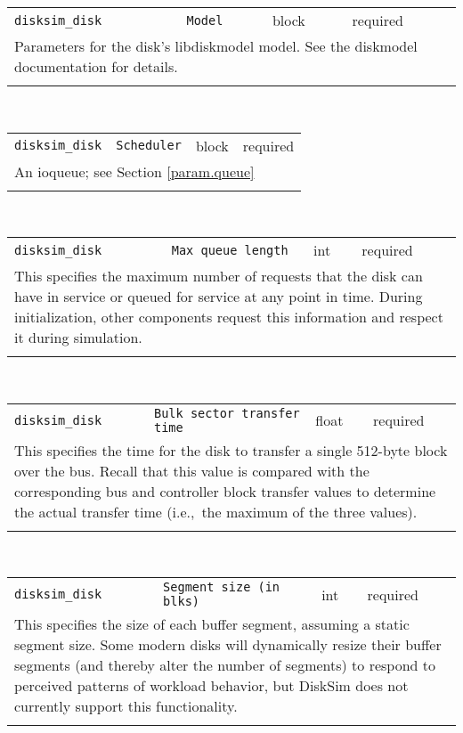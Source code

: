 \noindent 
\begin{tabular}{|p{1.5in}|p{3.5in}|p{0.5in}|p{0.5in}|}
\cline{1-4}
\texttt{disksim\_disk} & \texttt{Model} & block & required \\ 
\cline{1-4}
\multicolumn{4}{|p{6in}|}{
Parameters for the disk's libdiskmodel model. See the diskmodel
documentation for details.
}\\ 
\cline{1-4}
\multicolumn{4}{p{5in}}{}\\
\end{tabular}\\ 
\noindent 
\begin{tabular}{|p{1.5in}|p{3.5in}|p{0.5in}|p{0.5in}|}
\cline{1-4}
\texttt{disksim\_disk} & \texttt{Scheduler} & block & required \\ 
\cline{1-4}
\multicolumn{4}{|p{6in}|}{
An ioqueue; see Section \ref{param.queue}
}\\ 
\cline{1-4}
\multicolumn{4}{p{5in}}{}\\
\end{tabular}\\ 
\noindent 
\begin{tabular}{|p{1.5in}|p{3.5in}|p{0.5in}|p{0.5in}|}
\cline{1-4}
\texttt{disksim\_disk} & \texttt{Max queue length} & int & required \\ 
\cline{1-4}
\multicolumn{4}{|p{6in}|}{
This specifies the maximum number of requests that the disk can have in
service or queued for service at any point in time. During
initialization, other components request this information and respect
it during simulation.
}\\ 
\cline{1-4}
\multicolumn{4}{p{5in}}{}\\
\end{tabular}\\ 
\noindent 
\begin{tabular}{|p{1.5in}|p{3.5in}|p{0.5in}|p{0.5in}|}
\cline{1-4}
\texttt{disksim\_disk} & \texttt{Bulk sector transfer time} & float & required \\ 
\cline{1-4}
\multicolumn{4}{|p{6in}|}{
This specifies the time for the disk to transfer a single 512-byte block
over the bus. Recall that this value is compared with the
corresponding bus and controller block transfer values to determine
the actual transfer time (i.e.,~the maximum of the three values).
}\\ 
\cline{1-4}
\multicolumn{4}{p{5in}}{}\\
\end{tabular}\\ 
\noindent 
\begin{tabular}{|p{1.5in}|p{3.5in}|p{0.5in}|p{0.5in}|}
\cline{1-4}
\texttt{disksim\_disk} & \texttt{Segment size (in blks)} & int & required \\ 
\cline{1-4}
\multicolumn{4}{|p{6in}|}{
This specifies the size of each buffer segment, assuming a static segment
size. Some modern disks will dynamically resize their buffer segments
(and thereby alter the number of segments) to respond to perceived
patterns of workload behavior, but DiskSim does not currently support
this functionality.
}\\ 
\cline{1-4}
\multicolumn{4}{p{5in}}{}\\
\end{tabular}\\ 
